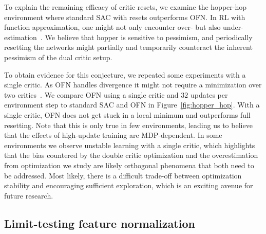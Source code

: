 To explain the remaining efficacy of critic resets, we examine the hopper-hop environment where standard SAC with resets outperforms OFN. 
In RL with function approximation, one might not only encounter over- but also under-estimation~\parencite{wu2020reducing, lan2020maxmin, saglam2021estimation}.
We believe that hopper  is sensitive to pessimism, and periodically resetting the networks might partially and temporarily counteract the inherent pessimism of the dual critic setup.

To obtain evidence for this conjecture, we repeated some experiments with a single critic. As OFN handles divergence it might not require a minimization over two critics~\parencite{fujimoto2018addressing}. We compare OFN using a single critic and $32$ updates per environment step to standard SAC and OFN in Figure~\ref{fig:hopper_hop}. With a single critic, OFN does not get stuck in a local minimum and outperforms full resetting. Note that this is only true in few environments, leading us to believe that the effects of high-update training are MDP-dependent.
In some environments we observe unstable learning with a single critic, which highlights that the bias countered by the double critic optimization and the overestimation from optimization we study are likely orthogonal phenomena that both need to be addressed.
Most likely, there is a difficult trade-off between optimization stability and encouraging sufficient exploration, which is an exciting avenue for future research.

\subsection{Limit-testing feature normalization}

